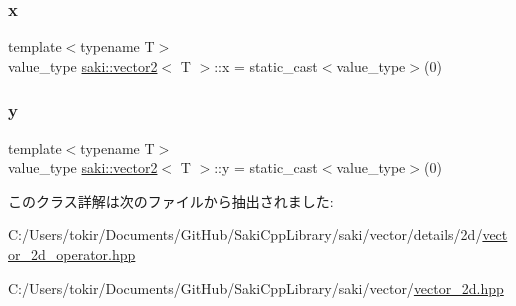 \subsubsection{\texorpdfstring{x}{x}}
{\footnotesize\ttfamily template$<$typename T$>$ \\
value\+\_\+type \mbox{\hyperlink{classsaki_1_1vector2}{saki\+::vector2}}$<$ T $>$\+::x = static\+\_\+cast$<$value\+\_\+type$>$(0)}

\mbox{\label{classsaki_1_1vector2_a6275c229b3652cc2c4d88850507c5aea}} 
\subsubsection{\texorpdfstring{y}{y}}
{\footnotesize\ttfamily template$<$typename T$>$ \\
value\+\_\+type \mbox{\hyperlink{classsaki_1_1vector2}{saki\+::vector2}}$<$ T $>$\+::y = static\+\_\+cast$<$value\+\_\+type$>$(0)}



このクラス詳解は次のファイルから抽出されました\+:\begin{DoxyCompactItemize}
\item 
C\+:/\+Users/tokir/\+Documents/\+Git\+Hub/\+Saki\+Cpp\+Library/saki/vector/details/2d/\mbox{\hyperlink{vector__2d__operator_8hpp}{vector\+\_\+2d\+\_\+operator.\+hpp}}\item 
C\+:/\+Users/tokir/\+Documents/\+Git\+Hub/\+Saki\+Cpp\+Library/saki/vector/\mbox{\hyperlink{vector__2d_8hpp}{vector\+\_\+2d.\+hpp}}\end{DoxyCompactItemize}
